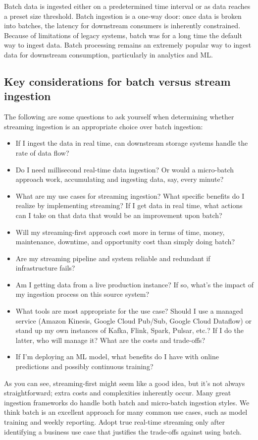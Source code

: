 Batch data is ingested either on a predetermined time interval or as data reaches a
preset size threshold. Batch ingestion is a one-way door: once data is broken into
batches, the latency for downstream consumers is inherently constrained. Because of
limitations of legacy systems, batch was for a long time the default way to ingest data.
Batch processing remains an extremely popular way to ingest data for downstream
consumption, particularly in analytics and ML.

\subsection*{Key considerations for batch versus stream ingestion}
The following
are some questions to ask yourself when determining whether streaming ingestion is
an appropriate choice over batch ingestion:
\begin{itemize}
    \item If I ingest the data in real time, can downstream storage systems handle the rate of data flow?
    \item Do I need millisecond real-time data ingestion? Or would a micro-batch approach work, accumulating and ingesting data, say, every minute?
    \item What are my use cases for streaming ingestion? What specific benefits do I realize by implementing streaming? If I get data in real time, what actions can I take on that data that would be an improvement upon batch?
    \item Will my streaming-first approach cost more in terms of time, money, maintenance, downtime, and opportunity cost than simply doing batch?
    \item Are my streaming pipeline and system reliable and redundant if infrastructure fails?
    \item Am I getting data from a live production instance? If so, what's the impact of my ingestion process on this source system?
    \item What tools are most appropriate for the use case? Should I use a managed service (Amazon Kinesis, Google Cloud Pub/Sub, Google Cloud Dataflow) or stand up my own instances of Kafka, Flink, Spark, Pulsar, etc.? If I do the latter, who will manage it? What are the costs and trade-offs?
    \item If I'm deploying an ML model, what benefits do I have with online predictions and possibly continuous training?
\end{itemize}
As you can see, streaming-first might seem like a good idea, but it's not always
straightforward; extra costs and complexities inherently occur. Many great ingestion
frameworks do handle both batch and micro-batch ingestion styles. We think batch
is an excellent approach for many common use cases, such as model training and
weekly reporting. Adopt true real-time streaming only after identifying a business use
case that justifies the trade-offs against using batch.








